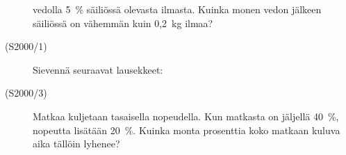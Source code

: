 \begin{description}
                        vedolla 5~\% säiliössä olevasta ilmasta. Kuinka monen vedon
                        jälkeen säiliössä on vähemmän kuin 0,2~kg ilmaa?
    \item[(S2000/1)]   Sievennä seuraavat lausekkeet:
                        \begin{alakohdat}
                        \end{alakohdat}
    \item[(S2000/3)]   Matkaa kuljetaan tasaisella nopeudella. Kun matkasta on
                        jäljellä 40~\%, nopeutta lisätään 20~\%. Kuinka monta
                        prosenttia koko matkaan kuluva aika tällöin lyhenee?

\end{description}
